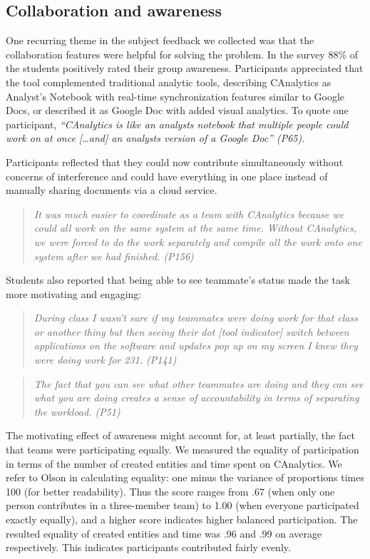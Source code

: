 \subsection{Collaboration and
awareness}\label{collaboration-and-awareness}


One recurring theme in the subject feedback we collected was that the
collaboration features were helpful for solving the problem. In the survey
88\% of the students positively rated their
group awareness. Participants appreciated that the tool complemented
traditional analytic tools, describing CAnalytics as Analyst's Notebook with real-time
synchronization features similar to Google Docs, or described it as Google Doc with added visual analytics. To quote one participant,
\emph{``CAnalytics is like an analysts notebook that multiple people
could work on at once {[}\ldots{}and{]} an analysts version of a Google
Doc'' (P65)}.

Participants reflected that they could now contribute simultaneously
without concerns of interference and could
have everything in one place instead of manually sharing documents via a
cloud service.

\begin{quote}
\emph{It was much easier to coordinate as a team with CAnalytics because we
could all work on the same system at the same time. Without CAnalytics,
we were forced to do the work separately and compile all the work onto
one system after we had finished. (P156)}
\end{quote}

Students also reported that being able to see teammate's status made the
task more motivating and engaging:

\begin{quote}
\emph{During class I wasn't sure if my teammates were doing work for that
class or another thing but then seeing their dot {[}tool indicator{]}
switch between applications on the software and updates pop up on my
screen I knew they were doing work for 231. (P141)}
\end{quote}

\begin{quote}
\emph{The fact that you can see what other teammates are doing and they can
see what you are doing creates a sense of accountability in terms of
separating the workload. (P51)}
\end{quote}

The motivating effect of awareness might account for, at least partially,
the fact that teams were participating equally. We measured the equality of
participation in terms of the number of created entities and time spent on
CAnalytics. We refer to Olson \cite{Olson2017} in calculating equality: one
minus the variance of proportions times 100 (for better readability). Thus
the score ranges from .67 (when only one person contributes in a three-member
team) to 1.00 (when everyone participated exactly equally), and a higher
score indicates higher balanced participation. The resulted equality of
created entities and time was .96 and .99 on average respectively. This
indicates participants contributed fairly evenly.

